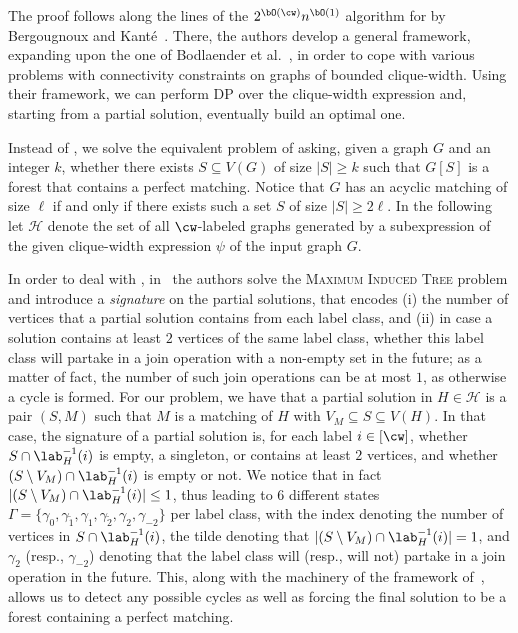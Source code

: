 \begin{proofsketch}
    The proof follows along the lines of the $2^{\bO(\cw)} n^{\bO(1)}$ algorithm for {\FVS} by Bergougnoux and Kant\'e~\cite{tcs/BergougnouxK19}.
    There, the authors develop a general framework, expanding upon the one of Bodlaender et al.~\cite{iandc/BodlaenderCKN15},
    in order to cope with various problems with connectivity constraints on graphs of bounded clique-width.
    Using their framework, we can perform DP over the clique-width expression and, starting from a partial solution,
    eventually build an optimal one.

    Instead of \AcyclicM, we solve the equivalent problem of asking,
    given a graph $G$ and an integer $k$, whether there exists $S \subseteq V(G)$ of size $|S| \ge k$ such that
    $G[S]$ is a forest that contains a perfect matching.
    Notice that $G$ has an acyclic matching of size $\ell$ if and only if there exists such a set $S$
    of size $|S| \ge 2\ell$.
    In the following let $\mathcal{H}$ denote the set of all $\cw$-labeled graphs generated
    by a subexpression of the given clique-width expression $\psi$ of the input graph $G$.

    In order to deal with \FVS, in~\cite{tcs/BergougnouxK19} the authors solve the \textsc{Maximum Induced Tree} problem and
    introduce a \emph{signature} on the partial solutions,
    that encodes (i) the number of vertices that a partial solution contains from each label class,
    and (ii) in case a solution contains at least $2$ vertices of the same label class,
    whether this label class will partake in a join operation with a non-empty set in the future;
    as a matter of fact, the number of such join operations can be at most $1$, as otherwise a cycle is formed.
    For our problem, we have that a partial solution in $H \in \mathcal{H}$
    is a pair $(S,M)$ such that $M$ is a matching of $H$ with $V_M \subseteq S \subseteq V(H)$.
    In that case, the signature of a partial solution is, for each label $i \in [\cw]$,
    whether $S \cap \lab^{-1}_H(i)$ is empty, a singleton, or contains at least $2$ vertices,
    and whether $(S \setminus V_M) \cap \lab^{-1}_H(i)$ is empty or not.
    We notice that in fact $|(S \setminus V_M) \cap \lab^{-1}_H(i)| \le 1$, thus leading to $6$ different states
    $\Gamma = \{\gamma_0, \gamma_{\tilde{1}}, \gamma_1, \gamma_{\tilde{2}}, \gamma_2, \gamma_{-2}\}$
    per label class, with the index denoting the number of vertices in $S \cap \lab^{-1}_H(i)$,
    the tilde denoting that $|(S \setminus V_M) \cap \lab^{-1}_H(i)| = 1$,
    and $\gamma_2$ (resp., $\gamma_{-2}$) denoting that the label class will (resp., will not)
    partake in a join operation in the future.
    This, along with the machinery of the framework of~\cite{tcs/BergougnouxK19},
    allows us to detect any possible cycles as well as forcing the final solution to be a forest containing a perfect matching.
\end{proofsketch}
